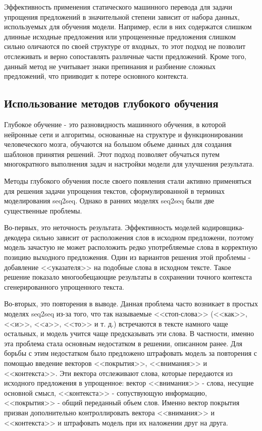 Эффективность применения статического машинного перевода для задачи упрощения предложений в значительной степени зависит от набора данных, используемых для обучения модели. Например, если в них содержатся слишком длинные исходные предложения или упрощененные предложения слишком сильно оличаются по своей структуре от входных, то этот подход не позволит отслеживать и верно сопоставлять различные части предложений. Кроме того, данный метод не учитывает знаки препинания и разбиение сложных предложений, что прииводит к потере основного контекста.


\subsection{Использование методов глубокого обучения}

Глубокое обучение - это разновидность машинного обучения, в которой нейронные сети и алгоритмы, основанные на структуре и функционировании человеческого мозга, обучаются на большом объеме данных для создания шаблонов принятия решений. Этот подход позволяет обучаться путем многократного выполнения задач и настройки модели для улучшения результата\cite{deep}.

Методы глубокого обучения после своего появления стали активно применяться для решения задачи упрощения текстов, сформулированной в терминах моделирования seq2seq. Однако в ранних моделях seq2seq были две существенные проблемы.

Во-первых, это неточность результата. Эффективность моделей кодировщика-декодера сильно зависит от расположения слов в исходном предложени, поэтому модель зачастую не может расположить редко употребляемые слова в корректную позицию выходного предложения. Один из вариантов решения этой проблемы -   добавление <<указателя>> на подобные слова в исходном тексте\cite{nisioi_exploring_2017}. Такое решение показало многообещающие результаты в сохранении точного контекста сгенерированного упрощенного текста.

Во-вторых, это повторения в выводе. Данная проблема часто возникает в простых моделях seq2seq из-за того, что так называемые <<стоп-слова>> (<<как>>, <<и>>, <<а>>, <<то>> и т. д.) встречаются в тексте намного чаще остальных, и модель учится чаще предсказывать эти слова. В частности, именно эта проблема стала основным недостатком в решении, описанном ранее\cite{nisioi_exploring_2017}. Для борьбы с этим недостатком было предложено штрафовать модель за повторения с помощью введение векторов <<покрытия>>, <<внимания>> и <<контекста>>. Эти вектора отслеживают слова, которые передаются из исходного предложения в упрощенное: вектор <<внимания>> - слова, несущие основной смысл, <<контекста>> - сопуствующую информацию, <<покрытия>> - общий переданный объем слов. Именно вектор покрытия призван дополнительно контроллировать вектора  <<внимания>> и <<контекста>> и штрафовать модель при их наложении друг на друга\cite{see_get_2017}.

